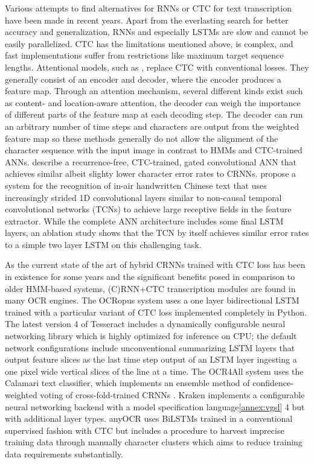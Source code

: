 Various attempts to find alternatives for RNNs or CTC for text transcription
have been made in recent years. Apart from the everlasting search for better
accuracy and generalization, RNNs and especially LSTMs are slow and cannot be
easily parallelized. CTC has the limitations mentioned above, is complex, and
fast implementations suffer from restrictions like maximum target sequence
lengths. Attentional models, such as
\cite{sueiras2018offline,michael2019evaluating,kang2018convolve}, replace CTC
with conventional losses. They generally consist of an encoder and decoder,
where the encoder produces a feature map.  Through an attention mechanism,
several different kinds exist such as content- and location-aware attention,
the decoder can weigh the importance of different parts of the feature map at
each decoding step. The decoder can run an arbitrary number of time steps and
characters are output from the weighted feature map so these methods generally
do not allow the alignment of the character sequence with the input image in
contrast to HMMs and CTC-trained ANNs. \cite{coquenet2020recurrence} describe a
recurrence-free, CTC-trained, gated convolutional ANN that achieves similar
albeit slighty lower character error rates to CRNNs. \cite{gan2020air} propose
a system for the recognition of in-air handwritten Chinese text that uses
increasingly strided 1D convolutional layers similar to non-causal temporal
convolutional networks (TCNs) to achieve large receptive fields in the feature
extractor. While the complete ANN architecture includes some final LSTM layers,
an ablation study shows that the TCN by itself achieves similar error rates to
a simple two layer LSTM on this challenging task.

As the current state of the art of hybrid CRNNs trained with CTC loss has been
in existence for some years and the significant benefits posed in comparison to
older HMM-based systems, (C)RNN+CTC transcription modules are found in many OCR
engines. The OCRopus system uses a one layer bidirectional LSTM trained with a
particular variant of CTC loss implemented completely in Python. The latest
version 4 of Tesseract includes a dynamically configurable neural networking
library which is highly optimized for inference on CPU; the default network
configurations include unconventional summarizing LSTM layers that output
feature slices as the last time step output of an LSTM layer ingesting a one
pixel wide vertical slices of the line at a time. The OCR4All system uses the
Calamari text classifier, which implements an ensemble method of
confidence-weighted voting of cross-fold-trained CRNNs \cite{wick2018calamari}.
Kraken implements a configurable neural networking backend with a model
specification language\ref{annex:vgsl} 4 but with additional layer types.
anyOCR\cite{bukhari2017anyocr} uses BiLSTMs trained in a conventional
supervised fashion with CTC but includes a procedure to harvest imprecise
training data through manually character clusters which aims to reduce training
data requirements substantially.

